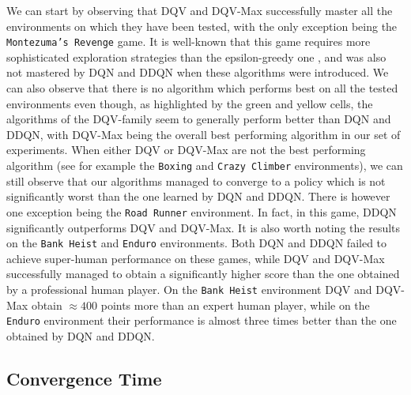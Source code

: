We can start by observing that DQV and DQV-Max successfully master all the environments on which they have been tested, with the only exception being the \texttt{Montezuma's Revenge} game. It is well-known that this game requires more sophisticated exploration strategies than the epsilon-greedy one \cite{fortunato2017noisy}, and was also not mastered by DQN and DDQN when these algorithms were introduced. We can also observe that there is no algorithm which performs best on all the tested environments even though, as highlighted by the green and yellow cells, the algorithms of the DQV-family seem to generally perform better than DQN and DDQN, with DQV-Max being the overall best performing algorithm in our set of experiments. When either DQV or DQV-Max are not the best performing algorithm (see for example the \texttt{Boxing} and \texttt{Crazy Climber} environments), we can still observe that our algorithms managed to converge to a policy which is not significantly worst than the one learned by DQN and DDQN.
There is however one exception being the \texttt{Road Runner} environment. In fact, in this game, DDQN significantly outperforms DQV and DQV-Max. It is also worth noting the results on the \texttt{Bank Heist} and \texttt{Enduro} environments. Both DQN and DDQN failed to achieve super-human performance on these games, while DQV and DQV-Max successfully managed to obtain a significantly higher score than the one obtained by a professional human player. On the \texttt{Bank Heist} environment DQV and DQV-Max obtain $\approx 400$ points more than an expert human player, while on the \texttt{Enduro} environment their performance is almost three times better than the one obtained by DQN and DDQN.




\subsection{Convergence Time}
\label{sec:convergence_time}


